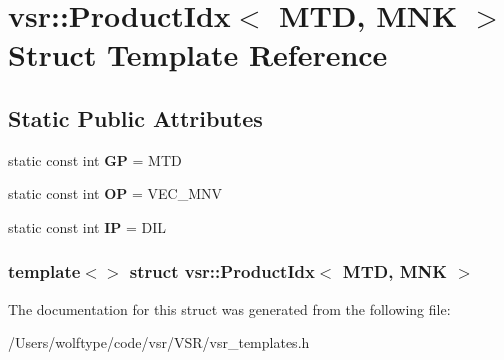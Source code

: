 \hypertarget{structvsr_1_1_product_idx_3_01_m_t_d_00_01_m_n_k_01_4}{\section{vsr\-:\-:Product\-Idx$<$ M\-T\-D, M\-N\-K $>$ Struct Template Reference}
\label{structvsr_1_1_product_idx_3_01_m_t_d_00_01_m_n_k_01_4}
}
\subsection*{Static Public Attributes}
\begin{DoxyCompactItemize}
\item 
\hypertarget{structvsr_1_1_product_idx_3_01_m_t_d_00_01_m_n_k_01_4_aaad323647f5d4623e94b0dfe17cb6064}{static const int {\bfseries G\-P} = M\-T\-D}\label{structvsr_1_1_product_idx_3_01_m_t_d_00_01_m_n_k_01_4_aaad323647f5d4623e94b0dfe17cb6064}

\item 
\hypertarget{structvsr_1_1_product_idx_3_01_m_t_d_00_01_m_n_k_01_4_af22de243341c7f2ad2835c9fcd5d43c1}{static const int {\bfseries O\-P} = V\-E\-C\-\_\-\-M\-N\-V}\label{structvsr_1_1_product_idx_3_01_m_t_d_00_01_m_n_k_01_4_af22de243341c7f2ad2835c9fcd5d43c1}

\item 
\hypertarget{structvsr_1_1_product_idx_3_01_m_t_d_00_01_m_n_k_01_4_a84473d2a63256974cf33fbaa9fe4ac8d}{static const int {\bfseries I\-P} = D\-I\-L}\label{structvsr_1_1_product_idx_3_01_m_t_d_00_01_m_n_k_01_4_a84473d2a63256974cf33fbaa9fe4ac8d}

\end{DoxyCompactItemize}
\subsubsection*{template$<$$>$ struct vsr\-::\-Product\-Idx$<$ M\-T\-D, M\-N\-K $>$}



The documentation for this struct was generated from the following file\-:\begin{DoxyCompactItemize}
\item 
/\-Users/wolftype/code/vsr/\-V\-S\-R/vsr\-\_\-templates.\-h\end{DoxyCompactItemize}
